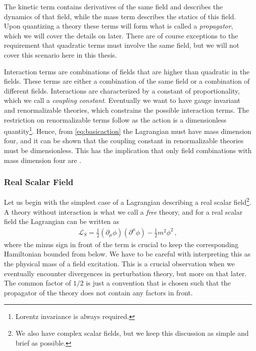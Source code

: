 The kinetic term contains derivatives of the same field and describes the dynamics of that field, while the mass term describes the statics of this field. Upon quantizing a theory these terms will form what is called a \emph{propagator}, which we will cover the details on later. There are of course exceptions to the requirement that quadratic terms must involve the same field, but we will not cover this scenario here in this thesis.

Interaction terms are combinations of fields that are higher than quadratic in the fields. These terms are either a combination of the same field or a combination of different fields. Interactions are characterized by a constant of proportionality, which we call a \emph{coupling constant}. Eventually we want to have gauge invariant and renormalizable theories, which constrains the possible interaction terms. The restriction on renormalizable terms follow as the action is a dimensionless quantity\footnote{Lorentz invariance is always required.}. Hence, from \cref{eq:basicaction} the Lagrangian must have mass dimension four, and it can be shown that the coupling constant in renormalizable theories must be dimensionless. This has the implication that only field combinations with mass dimension four are .

\subsubsection*{Real Scalar Field}
Let us begin with the simplest case of a Lagrangian describing a real scalar field\footnote{We also have complex scalar fields, but we keep this discussion as simple and brief as possible.}. A theory without interaction is what we call a \emph{free} theory, and for a real scalar field the Lagrangian can be written as
\begin{align}\label{eq:Lagrangian free scalar theory}
    \mathcal{L}_{S}=\frac{1}{2}(\partial_{\mu}\phi)(\partial^{\mu}\phi)-\frac{1}{2}m^{2}\phi^{2}\,,
\end{align}
where the minus sign in front of the  term is crucial to keep the corresponding Hamiltonian bounded from below. We have to be careful with interpreting this as the physical mass of a field excitation. This is a crucial observation when we eventually encounter divergences in perturbation theory, but more on that later. The common factor of $1/2$ is just a convention that is chosen such that the propagator of the theory does not contain any factors in front.

